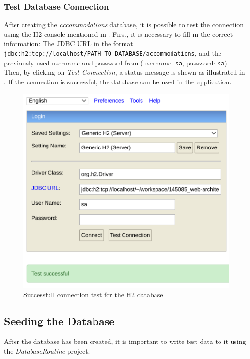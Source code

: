 \subsubsection{Test Database Connection}\label{sec:03_depl_h2_test}
After creating the \textit{accommodations} database, it is possible to test the connection using the H2 console mentioned in .
First, it is necessary to fill in the correct information: The JDBC URL in the format \texttt{jdbc:h2:tcp://localhost/PATH\_TO\_DATABASE/accommodations}, and the previously used username and password from  (username: \texttt{sa}, password: \texttt{sa}).
Then, by clicking on \textit{Test Connection}, a status message is shown as illustrated in . If the connection is successful, the database can be used in the application.
\begin{figure}[h]
\centering
\includegraphics[scale=0.3]{images/03_depl/h2_test}
\caption{Successfull connection test for the H2 database}
\label{fig:03_depl_createdb_h2test}
\end{figure}

\newpage
\subsection{Seeding the Database}\label{sec:03_depl_seeddb}
After the database has been created, it is important to write test data to it using the \textit{DatabaseRoutine} project.

